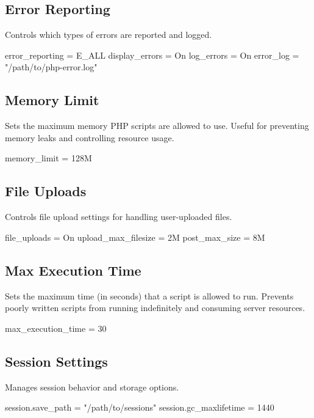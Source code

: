\documentclass{report}
\begin{document}
    \subsection{Error Reporting}
    \bigbreak \noindent 
    Controls which types of errors are reported and logged.
    \bigbreak \noindent 
    \begin{phpcode}
        error_reporting = E_ALL
        display_errors = On
        log_errors = On
        error_log = "/path/to/php-error.log"
    \end{phpcode}
    \bigbreak \noindent 
    \subsection{Memory Limit}
    \bigbreak \noindent 
    Sets the maximum memory PHP scripts are allowed to use. Useful for preventing memory leaks and controlling resource usage.
    \bigbreak \noindent 
    \begin{phpcode}
    memory_limit = 128M
    \end{phpcode}
    \bigbreak \noindent 
    \subsection{File Uploads}
    \bigbreak \noindent 
    Controls file upload settings for handling user-uploaded files.
    \bigbreak \noindent 
    \begin{phpcode}
        file_uploads = On
        upload_max_filesize = 2M
        post_max_size = 8M
    \end{phpcode}
    \bigbreak \noindent 
    \subsection{Max Execution Time}
    \bigbreak \noindent 
    Sets the maximum time (in seconds) that a script is allowed to run.
    \bigbreak \noindent 
    Prevents poorly written scripts from running indefinitely and consuming server resources.
    \bigbreak \noindent 
    \begin{phpcode}
    max_execution_time = 30
    \end{phpcode}
    \bigbreak \noindent 
    \subsection{Session Settings}
    \bigbreak \noindent 
    Manages session behavior and storage options.
    \bigbreak \noindent 
    \begin{phpcode}
        session.save_path = "/path/to/sessions"
        session.gc_maxlifetime = 1440
    \end{phpcode}
    \bigbreak \noindent 
\end{document}
